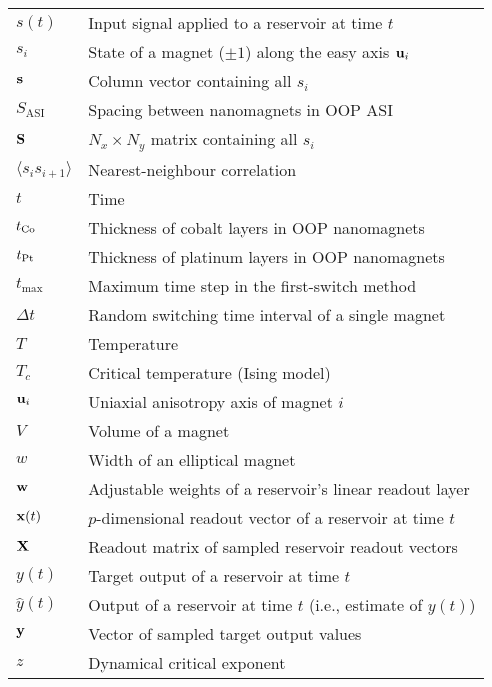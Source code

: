 \begin{longtable}[l]{p{50pt} p{295pt}}
	$s(t)$ & Input signal applied to a reservoir at time $t$ \\
	$s_i$ & State of a magnet ($\pm 1$) along the easy axis $\boldsymbol{\mathbf{u}}_i$ \\
	$\boldsymbol{\mathbf{s}}$ & Column vector containing all $s_i$ \\
	$S_\mathrm{ASI}$ & Spacing between nanomagnets in OOP ASI \\
	$\boldsymbol{\mathbf{S}}$ & $N_x \times N_y$ matrix containing all $s_i$ \\
	$\langle s_i s_{i+1} \rangle$ & Nearest-neighbour correlation\vspace{\whiteline}\\

	$t$ & Time \\
	$t_{\ce{Co}}$ & Thickness of cobalt layers in OOP nanomagnets \\
	$t_{\ce{Pt}}$ & Thickness of platinum layers in OOP nanomagnets \\
	$t_\mathrm{max}$ & Maximum time step in the first-switch method \\
	$\Delta t$ & Random switching time interval of a single magnet \\
	$T$ & Temperature \\
	$T_c$ & Critical temperature (Ising model)\vspace{\whiteline}\\

	$\boldsymbol{\mathbf{u}}_i$ & Uniaxial anisotropy axis of magnet $i$\vspace{\whiteline}\\

	$V$ & Volume of a magnet\vspace{\whiteline}\\

	$w$ & Width of an elliptical magnet \\
	$\boldsymbol{\mathbf{w}}$ & Adjustable weights of a reservoir's linear readout layer\vspace{\whiteline}\\
	
	$\boldsymbol{\mathbf{x}}(t)$ & $p$-dimensional readout vector of a reservoir at time $t$ \\
	$\boldsymbol{\mathbf{X}}$ & Readout matrix of sampled reservoir readout vectors\vspace{\whiteline}\\
	
	$y(t)$ & Target output of a reservoir at time $t$ \\
	$\hat{y}(t)$ & Output of a reservoir at time $t$ (i.e., estimate of $y(t)$) \\
	$\boldsymbol{\mathbf{y}}$ & Vector of sampled target output values\vspace{\whiteline}\\
	
	$z$ & Dynamical critical exponent\vspace{\whiteline}\\
\end{longtable}


